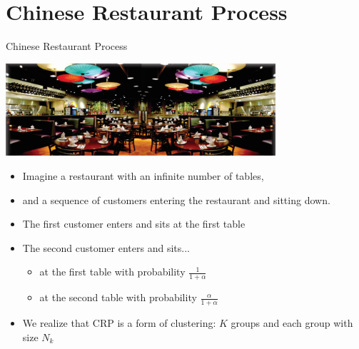 \documentclass[handout]{beamer}
\begin{document}
\section{Chinese Restaurant Process}
\begin{frame}{Chinese Restaurant Process}
    {\centering
    \includegraphics[width=0.75\textwidth]{figures/crp.png}\par
    }
    \pause

    \begin{itemize}
        \item Imagine a restaurant with an infinite number of tables,
        \item and a sequence of customers entering the restaurant and sitting down.
        \item The first customer enters and sits at the first table
        \item The second customer enters and sits...
            \begin{itemize}
                \item at the first table with probability $\frac{1}{1 + \alpha}$
                \item at the second table with probability $\frac{\alpha}{1 + \alpha}$
            \end{itemize}
        \item We realize that CRP is a form of clustering: $K$ groups and each group with size $N_k$
    \end{itemize}
\end{frame}


\end{document}
